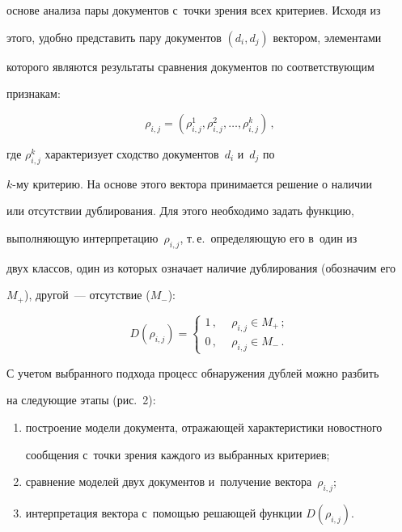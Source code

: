 основе анализа пары документов с~точки зрения всех критериев. Исходя из

этого, удобно представить пару документов $(d_i,d_j)$ вектором, элементами

которого являются результаты сравнения документов по соответствующим

признакам:

  \begin{equation*}

  \rho_{i,j}=\left( \rho_{i,j}^1,\rho_{i,j}^2, \ldots ,\rho_{i,j}^k\right)\,,


  \end{equation*}

  где $\rho_{i,j}^k$ характеризует сходство документов~$d_i$ и~$d_j$ по

  $k$-му критерию. На основе этого вектора принимается решение о наличии

или отсутствии дублирования. Для этого необходимо задать функцию,

выполняющую интерпретацию~$\rho_{i,j}$, т.\,е.\ определяющую его в~один из

двух классов, один из которых означает наличие дублирования (обозначим его

$M_+$), другой~--- отсутствие ($M_-$):

  \begin{equation}

  D(\rho_{i,j})=\begin{cases}

  1\,,\ &\ \rho_{i,j}\in M_+\,;\\

  0\,, & \ \rho_{i,j}\in M_-\,.

  \end{cases}

  \label{e2-sim}

  \end{equation}



  С учетом выбранного подхода процесс обнаружения дублей можно разбить

на следующие этапы (рис.~2):

  \begin{enumerate}[(1)]

\item построение модели документа, отражающей характеристики новостного

сообщения с~точки зрения каждого из выбранных критериев;

\item сравнение моделей двух документов и~получение вектора~$\rho_{i,j}$;

\item интерпретация вектора с~помощью решающей функции $D(\rho_{i,j})$.

\end{enumerate}



